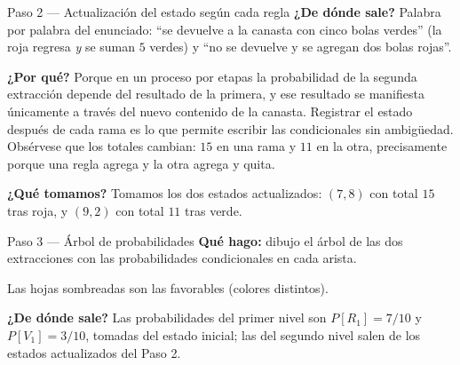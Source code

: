 \documentclass[11pt]{article}
\begin{document}
\begin{sol}
\begin{paso}{Paso 2 --- Actualizaci\'on del estado seg\'un cada regla}
\textbf{¿De d\'onde sale?} Palabra por palabra del enunciado: ``se devuelve a la canasta con cinco bolas verdes'' (la roja regresa \emph{y} se suman $5$ verdes) y ``no se devuelve y se agregan dos bolas rojas''.

\textbf{¿Por qu\'e?} Porque en un proceso por etapas la probabilidad de la segunda extracci\'on depende del resultado de la primera, y ese resultado se manifiesta \'unicamente a trav\'es del nuevo contenido de la canasta. Registrar el estado despu\'es de cada rama es lo que permite escribir las condicionales sin ambig\"uedad. Obs\'ervese que los totales cambian: $15$ en una rama y $11$ en la otra, precisamente porque una regla agrega y la otra agrega y quita.

\textbf{¿Qu\'e tomamos?} Tomamos los dos estados actualizados: $(7,8)$ con total $15$ tras roja, y $(9,2)$ con total $11$ tras verde.
\end{paso}

\begin{paso}{Paso 3 --- \'Arbol de probabilidades}
\textbf{Qu\'e hago:} dibujo el \'arbol de las dos extracciones con las probabilidades condicionales en cada arista.

\begin{center}
\end{center}
Las hojas sombreadas son las favorables (colores distintos).

\textbf{¿De d\'onde sale?} Las probabilidades del primer nivel son $P[R_1]=7/10$ y $P[V_1]=3/10$, tomadas del estado inicial; las del segundo nivel salen de los estados actualizados del Paso 2.


\end{paso}
\end{sol}
\end{document}
